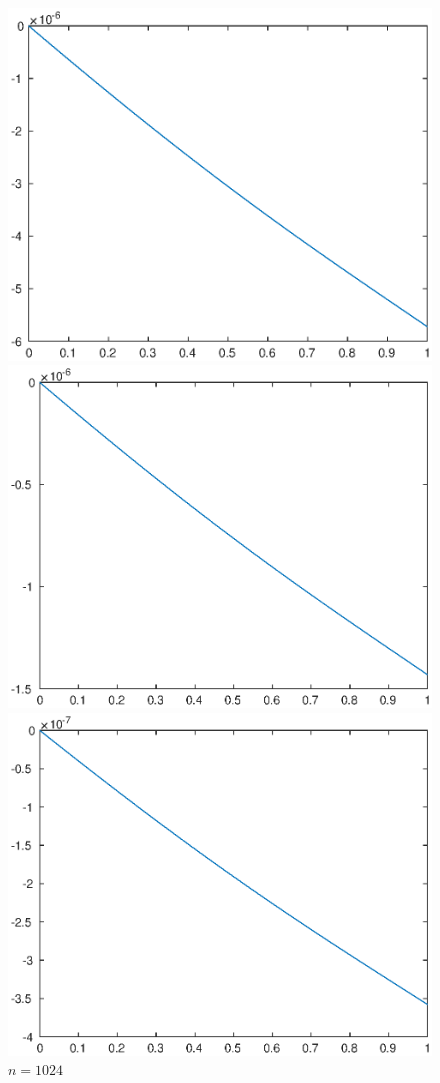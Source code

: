 \documentclass[lang=cn,10pt]{elegantbook}
\begin{document}
\begin{figure}[H]
  \centering
  \begin{minipage}[t]{0.24\linewidth}
      \centering
      \includegraphics[width=0.8\linewidth]{figure/1-3-1.eps}
      \caption*{$n=512$}
  \end{minipage}
  \begin{minipage}[t]{0.24\linewidth}
    \centering
    \includegraphics[width=0.8\linewidth]{figure/1-3-2.eps}
    \caption*{$n=1024$}
  \end{minipage}
  \begin{minipage}[t]{0.24\linewidth}
    \centering
    \includegraphics[width=0.8\linewidth]{figure/1-3-3.eps}

\end{minipage}
\end{figure}
\end{document}
